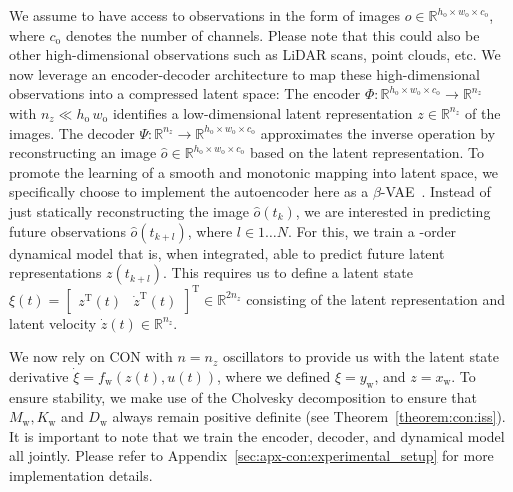 We assume to have access to observations in the form of images $o \in \mathbb{R}^{h_\mathrm{o} \times w_\mathrm{o} \times c_\mathrm{o}}$, where $c_\mathrm{o}$ denotes the number of channels. Please note that this could also be other high-dimensional observations such as LiDAR scans, point clouds, etc.
We now leverage an encoder-decoder architecture to map these high-dimensional observations into a compressed latent space: %
The encoder $\Phi: \mathbb{R}^{h_\mathrm{o} \times w_\mathrm{o} \times c_\mathrm{o}} \to \mathbb{R}^{n_z} $ with $n_z \ll h_\mathrm{o} \,  w_\mathrm{o}$ identifies a low-dimensional latent representation $z \in \mathbb{R}^{n_z}$ of the images. The decoder $\Psi: \mathbb{R}^{n_z} \to \mathbb{R}^{h_\mathrm{o} \times w_\mathrm{o} \times c_\mathrm{o}}$ approximates the inverse operation by reconstructing an image $\hat{o} \in \mathbb{R}^{h_\mathrm{o} \times w_\mathrm{o} \times c_\mathrm{o}}$ based on the latent representation.
To promote the learning of a smooth and monotonic mapping into latent space, we specifically choose to implement the autoencoder here as a $\beta$-\gls{VAE}~\cite{kingma2014auto, higgins2017beta}.
Instead of just statically reconstructing the image $\hat{o}(t_k)$, we are interested in predicting future observations $\hat{o}(t_{k+l})$, where $l \in 1 \dots N$. For this, we train a -order dynamical model that is, when integrated, able to predict future latent representations $z(t_{k+l})$.
This requires us to define a latent state $\xi(t) = \begin{bmatrix}
    z^\mathrm{T}(t) & \dot{z}^\mathrm{T}(t)
\end{bmatrix}^\mathrm{T} \in \mathbb{R}^{2n_z}$ consisting of the latent representation and latent velocity $\dot{z}(t) \in \mathbb{R}^{n_z}$.

We now rely on \gls{CON} with $n = n_z$ oscillators to provide us with the latent state derivative $\dot{\xi}= f_\mathrm{w}(z(t), u(t))$, where we defined $\xi = y_\mathrm{w}$, and $z = x_\mathrm{w}$. To ensure stability, we make use of the Cholvesky decomposition to ensure that $M_\mathrm{w}, K_\mathrm{w}$ and $D_\mathrm{w}$ always remain positive definite (see Theorem~\ref{theorem:con:iss}).
It is important to note that we train the encoder, decoder, and dynamical model all jointly.
Please refer to Appendix~\ref{sec:apx-con:experimental_setup} for more implementation details.

